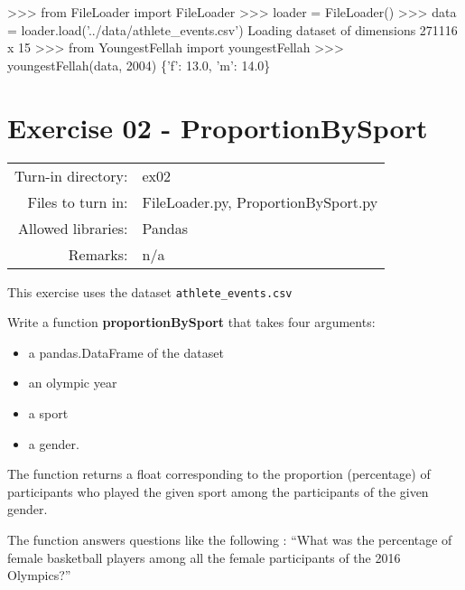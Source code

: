 \documentclass[]{article}
\newenvironment{Shaded}{\begin{snugshade}}{\end{snugshade}}
\newcommand{\DecValTok}[1]{\textcolor[rgb]{0.96,0.45,0.00}{#1}}
\newcommand{\FloatTok}[1]{\textcolor[rgb]{0.96,0.45,0.00}{#1}}
\newcommand{\ImportTok}[1]{\textcolor[rgb]{0.15,0.68,0.38}{#1}}
\newcommand{\NormalTok}[1]{\textcolor[rgb]{0.81,0.81,0.76}{#1}}
\newcommand{\OperatorTok}[1]{\textcolor[rgb]{0.81,0.81,0.76}{#1}}
\newcommand{\StringTok}[1]{\textcolor[rgb]{0.96,0.31,0.31}{#1}}
\begin{document}
\begin{Shaded}
\begin{Highlighting}[]
\OperatorTok{>>>} \ImportTok{from}\NormalTok{ FileLoader }\ImportTok{import}\NormalTok{ FileLoader}
\OperatorTok{>>>}\NormalTok{ loader }\OperatorTok{=}\NormalTok{ FileLoader()}
\OperatorTok{>>>}\NormalTok{ data }\OperatorTok{=}\NormalTok{ loader.load(}\StringTok{'../data/athlete_events.csv'}\NormalTok{)}
\NormalTok{Loading dataset of dimensions }\DecValTok{271116}\NormalTok{ x }\DecValTok{15}
\OperatorTok{>>>} \ImportTok{from}\NormalTok{ YoungestFellah }\ImportTok{import}\NormalTok{ youngestFellah}
\OperatorTok{>>>}\NormalTok{ youngestFellah(data, }\DecValTok{2004}\NormalTok{)}
\NormalTok{\{}\StringTok{'f'}\NormalTok{: }\FloatTok{13.0}\NormalTok{, }\StringTok{'m'}\NormalTok{: }\FloatTok{14.0}\NormalTok{\}}
\end{Highlighting}
\end{Shaded}

\clearpage

\hypertarget{exercise-02---proportionbysport-1}{%
\section{Exercise 02 -
ProportionBySport}\label{exercise-02---proportionbysport-1}}

\begin{longtable}[]{@{}rl@{}}
\toprule
\endhead
Turn-in directory: & ex02\tabularnewline
Files to turn in: & FileLoader.py, ProportionBySport.py\tabularnewline
Allowed libraries: & Pandas\tabularnewline
Remarks: & n/a\tabularnewline
\bottomrule
\end{longtable}

This exercise uses the dataset \texttt{athlete\_events.csv}

Write a function \textbf{proportionBySport} that takes four arguments:

\begin{itemize}
\item
  a pandas.DataFrame of the dataset
\item
  an olympic year
\item
  a sport
\item
  a gender.
\end{itemize}

The function returns a float corresponding to the proportion
(percentage) of participants who played the given sport among the
participants of the given gender.

The function answers questions like the following : ``What was the
percentage of female basketball players among all the female
participants of the 2016 Olympics?''
\end{document}
